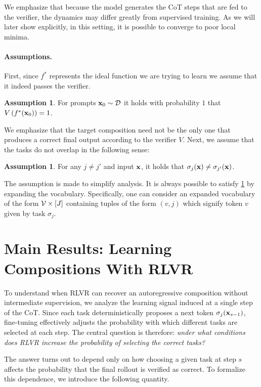 \documentclass{article}
\theoremstyle{plain}
\theoremstyle{definition}
\newtheorem{assumption}[theorem]{Assumption}
\theoremstyle{remark}
\begin{document}
We emphasize that because the model generates the CoT steps that are fed to the verifier, the dynamics may differ greatly from supervised training. As we will later show explicitly, in this setting, it is possible to converge to poor local minima. 

\paragraph{Assumptions.}
First, since $f^*$ represents the ideal function we are trying to learn we assume that it indeed passes the verifier.
\begin{assumption} \label{ass: value}
    For prompts $\mathbf{x}_0 \sim \mathcal{D}$ it holds with probability $1$ that $V\left(f^*(\mathbf{x}_0)\right) = 1$.
\end{assumption}
We emphasize that the target composition need not be the only one that produces a correct final output according to the verifier $V$. Next, we assume that the tasks do not overlap in the following sense:
\begin{assumption} \label{ass: incoherence}
    For any $j\neq j'$ and input $\mathbf{x}$, it holds that $\sigma_j(\mathbf{x})\neq \sigma_{j'}(\mathbf{x})$.
\end{assumption}
The assumption is made to simplify analysis. It is always possible to satisfy \cref{ass: incoherence} by expanding the vocabulary. Specifically, one can consider an expanded vocabulary of the form $\mathcal{V} \times [J]$ containing tuples of the form $(v, j)$ which signify token $v$ given by task $\sigma_j$.

\section{Main Results: Learning Compositions With RLVR}\label{sec: positive}
To understand when RLVR can recover an autoregressive composition without intermediate supervision, we analyze the learning signal induced at a single step of the CoT. Since each task deterministically proposes a next token $\sigma_j(\mathbf{x}_{s-1})$, fine-tuning effectively adjusts the probability with which different tasks are selected at each step. The central question is therefore: \emph{under what conditions does RLVR increase the probability of selecting the correct tasks?}

The answer turns out to depend only on how choosing a given task at step $s$ affects the probability that the final rollout is verified as correct. To formalize this dependence, we introduce the following quantity.
\end{document}
